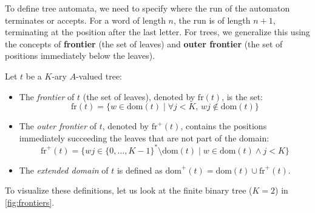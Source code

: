 
To define tree automata, we need to specify where the run of the automaton terminates or accepts. For a word of length $n$, the run is of length $n+1$, terminating at the position after the last letter. For trees, we generalize this using the concepts of \textbf{frontier} (the set of leaves) and \textbf{outer frontier} (the set of positions immediately below the leaves).

\begin{definition}[Frontiers]
Let $t$ be a $K$-ary $A$-valued tree:
\begin{itemize}
    \item The \emph{frontier} of $t$ (the set of leaves), denoted by $\text{fr}(t)$, is the set:
    $$\text{fr}(t) = \{ w \in \text{dom}(t) \mid \forall j < K, \, w j \notin \text{dom}(t) \}$$
    \item The \emph{outer frontier} of $t$, denoted by $\text{fr}^+(t)$, contains the positions immediately succeeding the leaves that are not part of the domain:
    $$\text{fr}^+(t) = \{ w j \in \{0, \dots, K-1\}^* \setminus \text{dom}(t) \mid w \in \text{dom}(t) \land j < K \}$$
    \item The \emph{extended domain} of $t$ is defined as $\text{dom}^+(t) = \text{dom}(t) \cup \text{fr}^+(t)$.
\end{itemize}
\end{definition}

To visualize these definitions, let us look at the finite binary tree ($K=2$) in \cref{fig:frontiers}.

